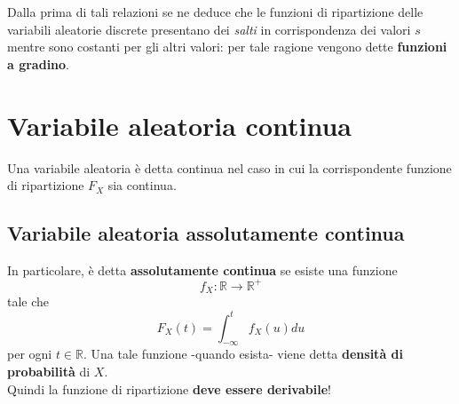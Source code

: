 Dalla prima di tali relazioni se ne deduce che le funzioni di ripartizione delle variabili aleatorie discrete presentano dei \textit{salti} in corrispondenza dei valori $s$ mentre sono costanti per gli altri valori: per tale ragione vengono dette \textbf{funzioni a gradino}.

\section{Variabile aleatoria continua}
Una variabile aleatoria è detta continua nel caso in cui la corrispondente funzione di ripartizione $F_X$ sia continua.

\subsection{Variabile aleatoria assolutamente continua}
In particolare, è detta \textbf{assolutamente continua} se esiste una funzione
\begin{equation}
f_X : \mathbb{R} \rightarrow \mathbb{R}^+
\end{equation}
tale che 
\begin{equation}
	F_X(t) = \int_{-\infty}^{t} f_X(u) du
\end{equation}
per ogni $t \in \mathbb{R}$.
Una tale funzione -quando esista- viene detta \textbf{densità di probabilità} di $X$. \\
Quindi la funzione di ripartizione \textbf{deve essere derivabile}!


